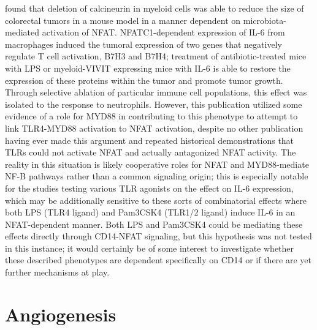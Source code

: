 \citet{Peuker2022} found that deletion of calcineurin in myeloid cells was able to reduce the size of colorectal tumors in a mouse model in a manner dependent on microbiota-mediated activation of NFAT. NFATC1-dependent expression of IL-6 from macrophages induced the tumoral expression of two genes that negatively regulate T cell activation, B7H3 and B7H4; treatment of antibiotic-treated mice with LPS or myeloid-VIVIT expressing mice with IL-6 is able to restore the expression of these proteins within the tumor and promote tumor growth. Through selective ablation of particular immune cell populations, this effect was isolated to the response to neutrophils. However, this publication utilized some evidence of a role for MYD88 in contributing to this phenotype to attempt to link TLR4-MYD88 activation to NFAT activation, despite no other publication having ever made this argument and repeated historical demonstrations that TLRs could not activate NFAT and actually antagonized NFAT activity. The reality in this situation is likely cooperative roles for NFAT and MYD88-mediate NF-\textkappa B pathways rather than a common signaling origin; this is especially notable for the studies testing various TLR agonists on the effect on IL-6 expression, which may be additionally sensitive to these sorts of combinatorial effects where both LPS (TLR4 ligand) and Pam3CSK4 (TLR1/2 ligand) induce IL-6 in an NFAT-dependent manner. Both LPS and Pam3CSK4 could be mediating these effects directly through CD14-NFAT signaling, but this hypothesis was not tested in this instance; it would certainly be of some interest to investigate whether these described phenotypes are dependent specifically on CD14 or if there are yet further mechanisms at play. 

\section{Angiogenesis}\label{angiogenesis}


